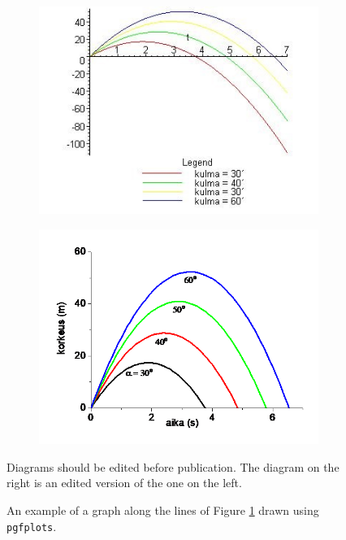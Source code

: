 \begin{figure}
\centering
\begin{subfigure}{0.49\textwidth}
\includegraphics[width=\textwidth]{figures/bad-example.jpg}
\end{subfigure}
\begin{subfigure}{0.49\textwidth}
\includegraphics[width=\textwidth]{figures/good-example.png}
\end{subfigure}
\caption[This is a short caption.]{Diagrams should be edited before publication. The diagram on the right is an edited version of the one on the left.}
\label{fig:huolittelu}
\end{figure}

\begin{figure}
\centering

\caption{An example of a graph along the lines of Figure \ref{fig:huolittelu} drawn using \texttt{pgfplots}.}
\label{fig:pgf-esimerkki}
\end{figure}

